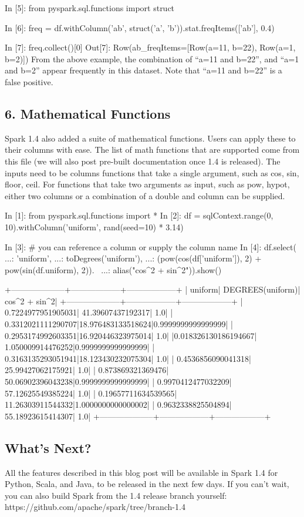 In [5]: from pyspark.sql.functions import struct

In [6]: freq = df.withColumn('ab', struct('a', 'b')).stat.freqItems(['ab'], 0.4)

In [7]: freq.collect()[0]
Out[7]: Row(ab_freqItems=[Row(a=11, b=22), Row(a=1, b=2)])
From the above example, the combination of “a=11 and b=22”, and “a=1 and b=2” appear frequently in this dataset. Note that “a=11 and b=22” is a false positive.

\subsection*{6. Mathematical Functions}
Spark 1.4 also added a suite of mathematical functions. Users can apply these to their columns with ease. The list of math functions that are supported come from this file (we will also post pre-built documentation once 1.4 is released). The inputs need to be columns functions that take a single argument, such as cos, sin, floor, ceil. For functions that take two arguments as input, such as pow, hypot, either two columns or a combination of a double and column can be supplied.

In [1]: from pyspark.sql.functions import *
In [2]: df = sqlContext.range(0, 10).withColumn('uniform', rand(seed=10) * 3.14)

In [3]: # you can reference a column or supply the column name
In [4]: df.select(
   ...:   'uniform',
   ...:   toDegrees('uniform'),
   ...:   (pow(cos(df['uniform']), 2) + pow(sin(df.uniform), 2)). \
   ...:     alias("cos^2 + sin^2")).show()

+--------------------+------------------+------------------+
|             uniform|  DEGREES(uniform)|     cos^2 + sin^2|
+--------------------+------------------+------------------+
|  0.7224977951905031| 41.39607437192317|               1.0|
|  0.3312021111290707|18.976483133518624|0.9999999999999999|
|  0.2953174992603351|16.920446323975014|               1.0|
|0.018326130186194667| 1.050009914476252|0.9999999999999999|
|  0.3163135293051941|18.123430232075304|               1.0|
|  0.4536856090041318| 25.99427062175921|               1.0|
|   0.873869321369476| 50.06902396043238|0.9999999999999999|
|  0.9970412477032209| 57.12625549385224|               1.0|
| 0.19657711634539565| 11.26303911544332|1.0000000000000002|
|  0.9632338825504894| 55.18923615414307|               1.0|
+--------------------+------------------+------------------+
\subsection*{What’s Next?}
All the features described in this blog post will be available in Spark 1.4 for Python, Scala, and Java, to be released in the next few days. If you can’t wait, you can also build Spark from the 1.4 release branch yourself: https://github.com/apache/spark/tree/branch-1.4

